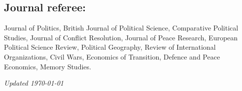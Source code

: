\documentclass[a4paper, 12pt]{article}
\begin{document}
\subsection*{Journal referee:}

Journal of Politics, British Journal of Political Science, Comparative Political Studies, Journal of Conflict Resolution, Journal of Peace Research, European Political Science Review, Political Geography, Review of International Organizations, Civil Wars, Economics of Transition, Defence and Peace Economics, Memory Studies.

%

%

%
%
%

\vfill

\noindent
\flushright
{\small\it Updated \monthdate\today}
\end{document}
